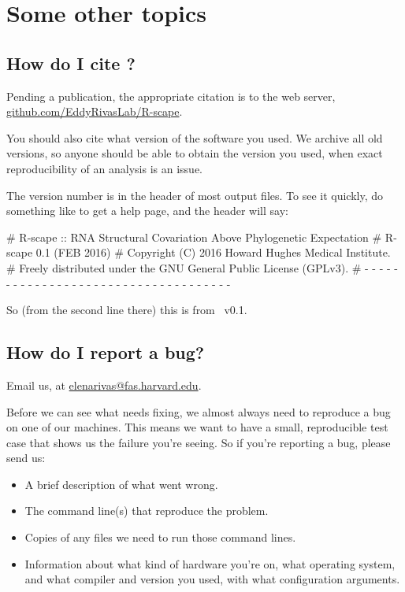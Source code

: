 
\section{Some other topics}
\label{section:more}
\setcounter{footnote}{0}

\subsection{How do I cite \rscape?}

Pending a publication, the appropriate citation is to the web server,
\url{github.com/EddyRivasLab/R-scape}.

You should also cite what version of the software you used. We archive
all old versions, so anyone should be able to obtain the version you
used, when exact reproducibility of an analysis is an issue.

The version number is in the header of most output files. To see it
quickly, do something like  to get a help page, and
the header will say:

\begin{sreoutput}
# R-scape :: RNA Structural Covariation Above Phylogenetic Expectation
# R-scape 0.1 (FEB 2016)
# Copyright (C) 2016 Howard Hughes Medical Institute.
# Freely distributed under the GNU General Public License (GPLv3).
# - - - - - - - - - - - - - - - - - - - - - - - - - - - - - - - - - - - -
\end{sreoutput}

So (from the second line there) this is from \rscape\ v0.1.

\subsection{How do I report a bug?}

Email us, at \url{elenarivas@fas.harvard.edu}.

Before we can see what needs fixing, we almost always need to
reproduce a bug on one of our machines. This means we want to have a
small, reproducible test case that shows us the failure you're seeing.
So if you're reporting a bug, please send us:

\begin{itemize}
 \item A brief description of what went wrong.
 \item The command line(s) that reproduce the problem.
 \item Copies of any files we need to run those command lines.
 \item Information about what kind of hardware you're on, what
   operating system, and what compiler and version you used, with what
   configuration arguments.
\end{itemize}



